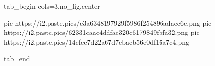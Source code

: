  
 
 
 
 


\ifcmt
  tab_begin cols=3,no_fig,center

     pic https://i2.paste.pics/c3a6348197929f5986f254896adaec6c.png
		 pic https://i2.paste.pics/62331caac4ddfae320c6179849fbfa32.png
		 pic https://i2.paste.pics/14cfec7d22a67d7ebacb56e0df16a7c4.png

  tab_end
\fi
